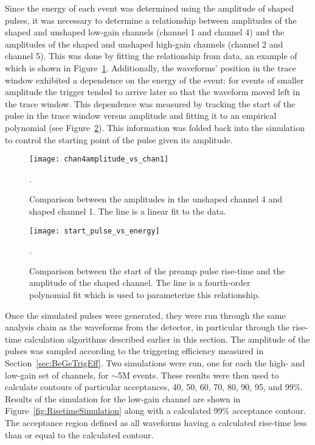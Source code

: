 	Since the energy of each event was determined using the amplitude of shaped pulses, it was necessary to determine a relationship between amplitudes of the shaped and unshaped low-gain channels (channel 1 and channel 4) and the amplitudes of the shaped and unshaped high-gain channels (channel 2 and channel 5).  This was done by fitting the relationship from data, an example of which is shown in Figure~\ref{fig:Risetimechan2vschan4}.  Additionally, the waveforms' position in the trace window exhibited a dependence on the energy of the event: for events of smaller amplitude the trigger tended to arrive later so that the waveform moved left in the trace window.  This dependence was measured by tracking the start of the pulse in the trace window versus amplitude and fitting it to an empirical polynomial (see Figure~\ref{fig:TriggerPositionDependence}).  This information was folded back into the simulation to control the starting point of the pulse given its amplitude.
	
					\begin{figure}
						\centering
						\texttt{[image: chan4amplitude\_vs\_chan1]}
						\caption[Comparison between the amplitudes in the unshaped and shaped BeGe channels]
						{Comparison between the amplitudes in the unshaped channel 4 and shaped channel 1.  
						The line is a linear fit to the data.}
						\label{fig:Risetimechan2vschan4}.
					\end{figure}
					
					\begin{figure}
						\centering
						\texttt{[image: start\_pulse\_vs\_energy]}
						\caption[Comparison between the start of the preamp pulse rise-time and the amplitude of the shaped channel for the BeGe]
						{Comparison between the start of the preamp pulse rise-time and the amplitude of the shaped
						 channel.  The line is a fourth-order polynomial fit which is used to parameterize this relationship.}
						\label{fig:TriggerPositionDependence}.
					\end{figure}					
	
	Once the simulated pulses were generated, they were run through the same analysis chain as the waveforms from the detector, in particular through the rise-time calculation algorithms described earlier in this section.  The amplitude of the pulses was sampled according to the triggering efficiency measured in Section~\ref{sec:BeGeTrigEff}.  Two simulations were run, one for each the high- and low-gain set of channels, for $\sim$5M events.  These results were then used to calculate contours of particular acceptances, 40, 50, 60, 70, 80, 90, 95, and 99\%.  Results of the simulation for the low-gain channel are shown in Figure~\ref{fig:RisetimeSimulation} along with a calculated 99\% acceptance contour.  The acceptance region defined as all waveforms having a calculated rise-time less than or equal to the calculated contour.  
					
